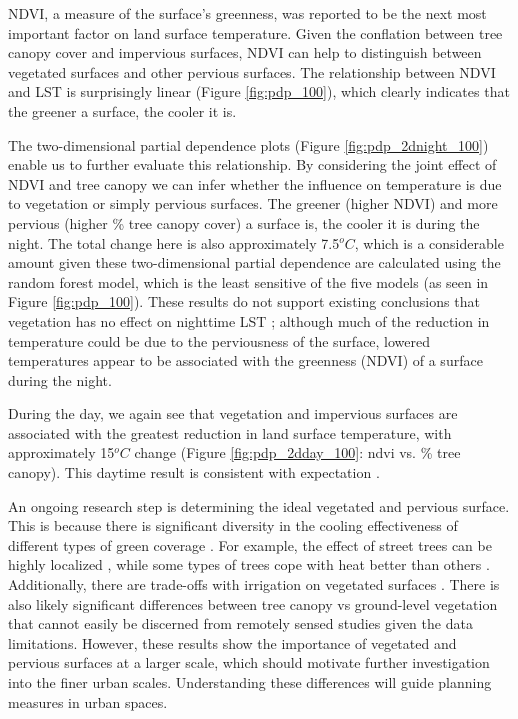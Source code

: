 \documentclass[final,3p,times,onecolumn,sort&compress]{elsarticle}
\begin{document}
NDVI, a measure of the surface's greenness, was reported to be the next most important factor on land surface temperature. 
Given the conflation between tree canopy cover and impervious surfaces, NDVI can help to distinguish between vegetated surfaces and other pervious surfaces.
The relationship between NDVI and LST is surprisingly linear (Figure \ref{fig:pdp_100}), which clearly indicates that the greener a surface, the cooler it is.

The two-dimensional partial dependence plots (Figure \ref{fig:pdp_2dnight_100}) enable us to further evaluate this relationship.
By considering the joint effect of NDVI and tree canopy we can infer whether the influence on temperature is due to vegetation or simply pervious surfaces. 
The greener (higher NDVI) and more pervious (higher \% tree canopy cover) a surface is, the cooler it is during the night. 
The total change here is also approximately 7.5$^oC$, which is a considerable amount given these two-dimensional partial dependence are calculated using the random forest model, which is the least sensitive of the five models (as seen in Figure \ref{fig:pdp_100}).
These results do not support existing conclusions that vegetation has no effect on nighttime LST \citep{Peng2012-iy, Zhou2014-wc};
although much of the reduction in temperature could be due to the perviousness of the surface, lowered temperatures appear to be associated with the greenness (NDVI) of a surface during the night.

During the day, we again see that vegetation and impervious surfaces are associated with the greatest reduction in land surface temperature, with approximately 15$^oC$ change (Figure \ref{fig:pdp_2dday_100}: ndvi vs. \% tree canopy). 
This daytime result is consistent with expectation \citep{Chun2017-mm, Peng2018-cp, Wang2019-tree,Zhou2014-wc, Chun2018-so}.

An ongoing research step is determining the ideal vegetated and pervious surface.
This is because there is significant diversity in the cooling effectiveness of different types of green coverage \citep{Saaroni2018-ct}. 
For example, the effect of street trees can be highly localized \citep{Coutts2016-og}, while some types of trees cope with heat better than others \citep{Leuzinger2010-si}. 
Additionally, there are trade-offs with irrigation on vegetated surfaces \citep{Gober2009-im}.
There is also likely significant differences between tree canopy vs ground-level vegetation that cannot easily be discerned from remotely sensed studies given the data limitations.
However, these results show the importance of vegetated and pervious surfaces at a larger scale, which should motivate further investigation into the finer urban scales.
Understanding these differences will guide planning measures in urban spaces.
\end{document}
